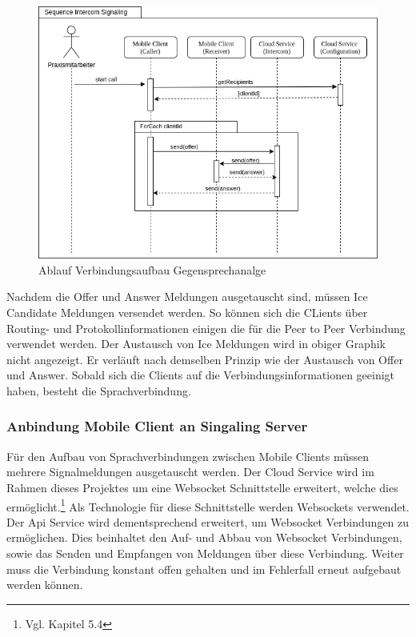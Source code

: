 \begin{figure}[h]
    \centering
    \begin{minipage}[b]{0.9\textwidth}
        \includegraphics[width=\textwidth]{graphics/diagramms/Sequence_Intercom_Broking_V02}
        \caption{Ablauf Verbindungsaufbau Gegensprechanalge}
    \end{minipage}
\end{figure}

Nachdem die Offer und Answer Meldungen ausgetauscht sind, müssen Ice Candidate Meldungen versendet werden.
So können sich die CLients über Routing- und Protokollinformationen einigen die für die Peer to Peer Verbindung verwendet werden.
Der Austausch von Ice Meldungen wird in obiger Graphik nicht angezeigt.
Er verläuft nach demselben Prinzip wie der Austausch von Offer und Answer.
Sobald sich die Clients auf die Verbindungsinformationen geeinigt haben, besteht die Sprachverbindung.

\clearpage

\subsubsection{Anbindung Mobile Client an Singaling Server}

Für den Aufbau von Sprachverbindungen zwischen Mobile Clients müssen mehrere Signalmeldungen ausgetauscht werden.
Der Cloud Service wird im Rahmen dieses Projektes um eine Websocket Schnittstelle erweitert, welche dies ermöglicht.\footnote{Vgl. Kapitel 5.4}
Als Technologie für diese Schnittstelle werden Websockets verwendet.
Der Api Service wird dementsprechend erweitert, um Websocket Verbindungen zu ermöglichen.
Dies beinhaltet den Auf- und Abbau von Websocket Verbindungen, sowie das Senden und Empfangen von Meldungen über diese Verbindung.
Weiter muss die Verbindung konstant offen gehalten und im Fehlerfall erneut aufgebaut werden können.

